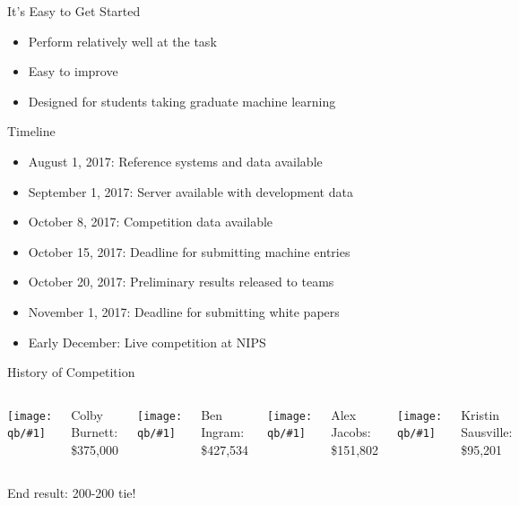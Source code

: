 \documentclass[xcolor=dvipsnames]{beamer}
\newcommand{\gfxq}[2]{
\begin{center}
	\texttt{[image: qb/\#1]}
\end{center}
}
\begin{document}
\begin{frame}{It's Easy to Get Started}

  \begin{itemize}
    \item Perform relatively well at the task
    \item Easy to improve
    \item Designed for students taking graduate machine learning
  \end{itemize}

\end{frame}

\begin{frame}{Timeline}

  \begin{itemize}
    \item August 1, 2017: Reference systems and data available
    \item September 1, 2017: Server available with development data
    \item October 8, 2017: Competition data available
    \item October 15, 2017: Deadline for submitting machine entries
    \item October 20, 2017: Preliminary results released to teams 
    \item November 1, 2017: Deadline for submitting white papers
    \item Early December: Live competition at NIPS 
  \end{itemize}

\end{frame}


\begin{frame}{History of Competition}

		\begin{columns}
				\gfxq{colby_jeo}{1.0}
                                Colby Burnett:
                                \$375,000
				\gfxq{ben_jeo}{1.0}
                                Ben Ingram:
                                \$427,534
				\gfxq{alex_jeo}{1.0}
                                Alex Jacobs: \$151,802
				\gfxq{kristin_jeo}{1.0}
                                Kristin Sausville: \$95,201
		\end{columns}

                \pause

                \begin{center}
                End result: 200-200 tie!
                \end{center}

\end{frame}
\end{document}
